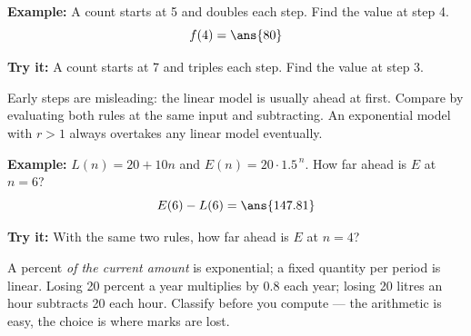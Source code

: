 \documentclass[12pt]{article}
\begin{document}
\begin{examplebox}
\textbf{Example:} A count starts at 5 and doubles each step. Find the value at
step 4.
\[ f(4) = \ans{80} \]
\end{examplebox}

\begin{tryitbox}
\textbf{Try it:} A count starts at 7 and triples each step. Find the value at
step 3.\\[2pt]
\end{tryitbox}


\begin{formulabox}
Early steps are misleading: the linear model is usually ahead at first. Compare
by evaluating both rules at the same input and subtracting. An exponential model
with $r > 1$ always overtakes any linear model eventually.
\end{formulabox}

\begin{examplebox}
\textbf{Example:} $L(n) = 20 + 10n$ and $E(n) = 20 \cdot 1.5^{\,n}$. How far
ahead is $E$ at $n = 6$?
\[ E(6) - L(6) = \ans{147.81} \]
\end{examplebox}

\begin{tryitbox}
\textbf{Try it:} With the same two rules, how far ahead is $E$ at $n = 4$?
\\[2pt]
\end{tryitbox}


\begin{formulabox}
A percent \emph{of the current amount} is exponential; a fixed quantity per
period is linear. Losing 20 percent a year multiplies by 0.8 each year; losing
20 litres an hour subtracts 20 each hour. Classify before you compute --- the
arithmetic is easy, the choice is where marks are lost.
\end{formulabox}
\end{document}
